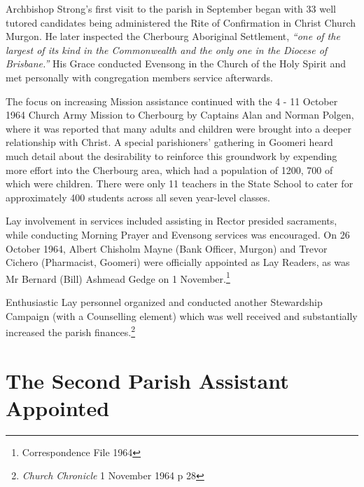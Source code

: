 Archbishop Strong's first visit to the parish in September began with 33 well tutored candidates being administered the Rite of Confirmation in Christ Church Murgon. He later inspected the Cherbourg Aboriginal Settlement, \emph{``one of the largest of its kind in the Commonwealth and the only one in the Diocese of Brisbane.''} His Grace conducted Evensong in the Church of the Holy Spirit and met personally with congregation members service afterwards.



The focus on increasing Mission assistance continued with the 4 - 11 October 1964 Church Army Mission to Cherbourg by Captains Alan and Norman Polgen, where it was reported that many adults and children were brought into a deeper relationship with Christ. A special parishioners' gathering in Goomeri heard much detail about the desirability to reinforce this groundwork by expending more effort into the Cherbourg area, which had a population of 1200, 700 of which were children. There were only 11 teachers in the State School to cater for approximately 400 students across all seven year-level classes.



Lay involvement in services included assisting in Rector presided sacraments, while conducting Morning Prayer and Evensong services was encouraged. On 26 October 1964, Albert Chisholm Mayne (Bank Officer, Murgon) and Trevor Cichero (Pharmacist, Goomeri) were officially appointed as Lay Readers, as was Mr Bernard (Bill) Ashmead Gedge on 1 November.\footnote{Correspondence File 1964}


Enthusiastic Lay personnel organized and conducted another Stewardship Campaign (with a Counselling element) which was well received and substantially increased the parish finances.\footnote{\emph{Church Chronicle} 1 November 1964 p 28}


\section{The Second Parish Assistant Appointed}









